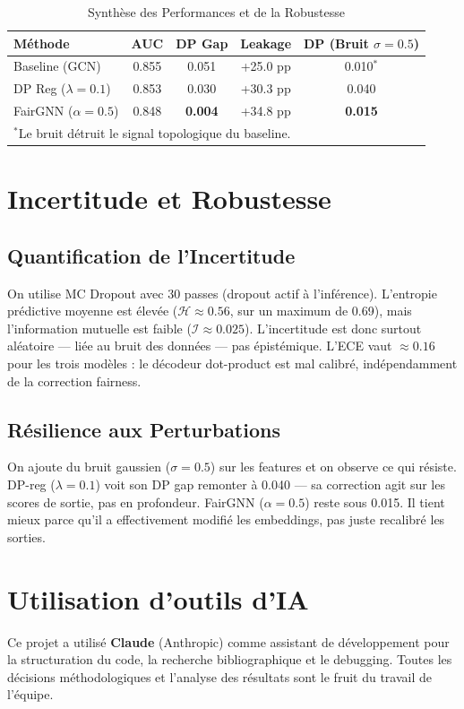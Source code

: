\documentclass[conference, a4paper]{IEEEtran}
\begin{document}
\begin{table}[htbp]
\centering
\caption{Synthèse des Performances et de la Robustesse}
\label{tab:results}
\begin{tabular}{lcccc}
\toprule
\textbf{Méthode} & \textbf{AUC} & \textbf{DP Gap} & \textbf{Leakage} & \textbf{DP (Bruit $\sigma=0.5$)} \\
\midrule
Baseline (GCN) & 0.855 & 0.051 & +25.0 pp & 0.010$^*$ \\
DP Reg ($\lambda=0.1$) & 0.853 & 0.030 & +30.3 pp & 0.040 \\
FairGNN ($\alpha=0.5$) & 0.848 & \textbf{0.004} & +34.8 pp & \textbf{0.015} \\
\bottomrule
\multicolumn{5}{l}{\scriptsize $^*$Le bruit détruit le signal topologique du baseline.}
\end{tabular}
\end{table}

\section{Incertitude et Robustesse}

\subsection{Quantification de l'Incertitude}
On utilise MC Dropout \cite{gal2016dropout} avec 30 passes (dropout actif à l'inférence). L'entropie prédictive moyenne est élevée ($\mathcal{H} \approx 0.56$, sur un maximum de 0.69), mais l'information mutuelle est faible ($\mathcal{I} \approx 0.025$). L'incertitude est donc surtout aléatoire — liée au bruit des données — pas épistémique. L'ECE vaut $\approx 0.16$ pour les trois modèles : le décodeur dot-product est mal calibré, indépendamment de la correction fairness.

\subsection{Résilience aux Perturbations}
On ajoute du bruit gaussien ($\sigma=0.5$) sur les features et on observe ce qui résiste. DP-reg ($\lambda=0.1$) voit son DP gap remonter à 0.040 — sa correction agit sur les scores de sortie, pas en profondeur. FairGNN ($\alpha=0.5$) reste sous 0.015. Il tient mieux parce qu'il a effectivement modifié les embeddings, pas juste recalibré les sorties.

\section{Utilisation d'outils d'IA}
Ce projet a utilisé \textbf{Claude} (Anthropic) comme assistant de développement pour la structuration du code, la recherche bibliographique et le debugging. Toutes les décisions méthodologiques et l'analyse des résultats sont le fruit du travail de l'équipe.
\end{document}
